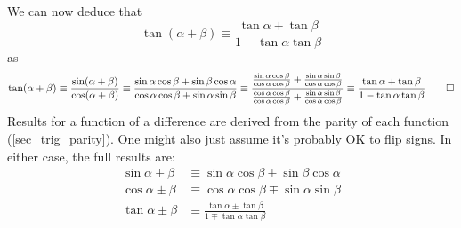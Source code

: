 \documentclass[fleqn,a4paper,11pt]{article}
\begin{document}
    We can now deduce that
    \begin{equation}
    \tan(\alpha + \beta) \equiv
        \frac{\tan \alpha + \tan \beta}{1 - \tan \alpha \tan \beta}
    \end{equation}
    as
    \begin{equation*}
    \tan(\alpha + \beta) \equiv
        \frac{\sin(\alpha + \beta)}{\cos(\alpha + \beta)} \equiv
        \frac{\sin \alpha \cos \beta + \sin \beta \cos \alpha}
             {\cos \alpha \cos \beta + \sin \alpha \sin \beta} \equiv
        \frac{\frac{\sin \alpha \cos \beta}{\cos \alpha \cos \beta} +
              \frac{\sin \alpha \sin \beta}{\cos \alpha \cos \beta}}
             {\frac{\cos \alpha \cos \beta}{\cos \alpha \cos \beta} +
              \frac{\sin \alpha \sin \beta}{\cos \alpha \cos \beta}}
             \equiv
        \frac{\tan \alpha + \tan \beta}{1 - \tan \alpha \tan \beta} \qed
    \end{equation*}
    Results for a function of a difference are derived from the parity of
    each function (\ref{sec_trig_parity}). One might also just assume it's
    probably OK to flip signs. In either case, the full results are:
    \begin{align}
    \sin \alpha \pm \beta &\equiv
       \sin \alpha \cos \beta \pm \sin \beta \cos \alpha \\
    \cos \alpha \pm \beta &\equiv
       \cos \alpha \cos \beta \mp \sin \alpha \sin \beta \\
    \tan \alpha \pm \beta &\equiv
        \frac{\tan \alpha \pm \tan \beta}{1 \mp \tan \alpha \tan \beta}
    \end{align}
\end{document}
